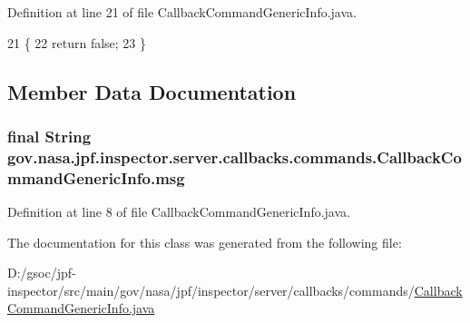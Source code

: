 Definition at line 21 of file Callback\+Command\+Generic\+Info.\+java.


\begin{DoxyCode}
21                                  \{
22     \textcolor{keywordflow}{return} \textcolor{keyword}{false};
23   \}
\end{DoxyCode}


\subsection{Member Data Documentation}
\subsubsection[{\texorpdfstring{msg}{msg}}]{\setlength{\rightskip}{0pt plus 5cm}final String gov.\+nasa.\+jpf.\+inspector.\+server.\+callbacks.\+commands.\+Callback\+Command\+Generic\+Info.\+msg\hspace{0.3cm}{\ttfamily [private]}}\hypertarget{classgov_1_1nasa_1_1jpf_1_1inspector_1_1server_1_1callbacks_1_1commands_1_1_callback_command_generic_info_a8abf18685ad4efcc4655476cd6340c2e}{}\label{classgov_1_1nasa_1_1jpf_1_1inspector_1_1server_1_1callbacks_1_1commands_1_1_callback_command_generic_info_a8abf18685ad4efcc4655476cd6340c2e}


Definition at line 8 of file Callback\+Command\+Generic\+Info.\+java.



The documentation for this class was generated from the following file\+:\begin{DoxyCompactItemize}
\item 
D\+:/gsoc/jpf-\/inspector/src/main/gov/nasa/jpf/inspector/server/callbacks/commands/\hyperlink{_callback_command_generic_info_8java}{Callback\+Command\+Generic\+Info.\+java}\end{DoxyCompactItemize}
